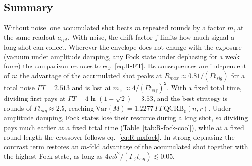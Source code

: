 \subsection{Summary}

Without noise, one accumulated shot beats $m$ repeated rounds by a factor $m$, at the same readout $a_{opt}$. With noise, the drift factor $f$ limits how much signal a long shot can collect. Wherever the envelope does not change with the exposure (vacuum under amplitude damping, any Fock state under dephasing for a weak force) the comparison reduces to eq.~\eqref{eq:R-FT}. Its consequences are independent of $n$: the advantage of the accumulated shot peaks at $R_{max} \approx 0.81/(\Gamma t_{sig})$ for a total noise $\Gamma T = 2.513$ and is lost at $m_\times \approx 4/(\Gamma t_{sig})^2$. With a fixed total time, dividing first pays at $\Gamma T = 4\ln(1+\sqrt{2}) = 3.53$, and the best strategy is rounds of $\Gamma t_{sig} \approx 2.5$, reaching $\mathrm{Var}(M) = 1.2277\,\Gamma T\,\mathrm{QCRB}_0(n, r)$. Under amplitude damping, Fock states lose their resource during a long shot, so dividing pays much earlier at a fixed total time (Table~\ref{tab:R-fock-cool}), while at a fixed round length the crossover follows eq.~\eqref{eq:R-mxfock}. In strong dephasing the contrast term restores an $m$-fold advantage of the accumulated shot together with the highest Fock state, as long as $4mb^2/(\Gamma_\phi t_{sig}) \lesssim 0.05$.
